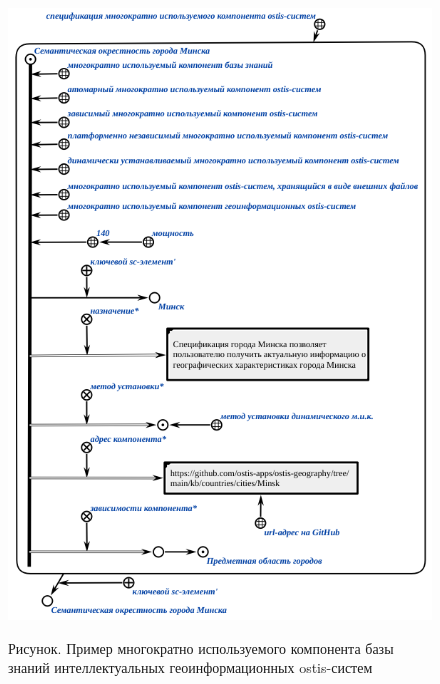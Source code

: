 \begin{figure}[H]
	\caption{Рисунок. Пример многократно используемого компонента базы знаний интеллектуальных геоинформационных ostis-систем}
	\includegraphics[scale=0.8]{author/part7/figures/gis_kb_component.png}
	\label{fig:gis_kb_component}
\end{figure}

